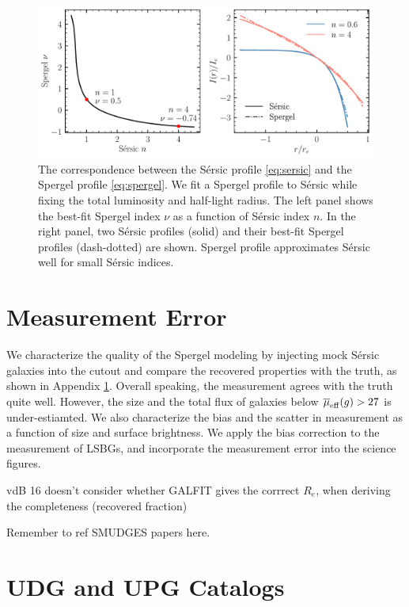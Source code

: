 \documentclass[twocolumn,astrosymb,twocolappendix]{aastex631}
\newcommand{\sersic}{S\'ersic}
\begin{document}
\begin{CJK*}{UTF8}{gbsn}
\begin{figure}
	\vbox{ 
		\centering
		\includegraphics[width=0.75\linewidth]{spergel_sersic_calib.pdf}
	}
    \caption{The correspondence between the \sersic{} profile \eqref{eq:sersic} and the Spergel profile \eqref{eq:spergel}. We fit a Spergel profile to \sersic{} while fixing the total luminosity and half-light radius. The left panel shows the best-fit Spergel index $\nu$ as a function of \sersic{} index $n$. In the right panel, two \sersic{} profiles (solid) and their best-fit Spergel profiles (dash-dotted) are shown. Spergel profile approximates \sersic{} well for small \sersic{} indices.  
    }
    \label{fig:spgl_calib}
\end{figure}


\section{Measurement Error}\label{ap:meas_error}

We characterize the quality of the Spergel modeling by injecting mock \sersic{} galaxies into the cutout and compare the recovered properties with the truth, as shown in Appendix \ref{ap:meas_error}. Overall speaking, the measurement agrees with the truth quite well. However, the size and the total flux of galaxies below $\overline{\mu}_{\rm eff} (g) > 27$ is under-estiamted. We also characterize the bias and the scatter in measurement as a function of size and surface brightness. We apply the bias correction to the measurement of LSBGs, and incorporate the measurement error into the science figures. 



vdB 16 doesn't consider whether GALFIT gives the corrrect $R_e$, when deriving the completeness (recovered fraction)

Remember to ref SMUDGES papers here.


\section{UDG and UPG Catalogs}
\onecolumngrid 


\end{CJK*}
\end{document}
